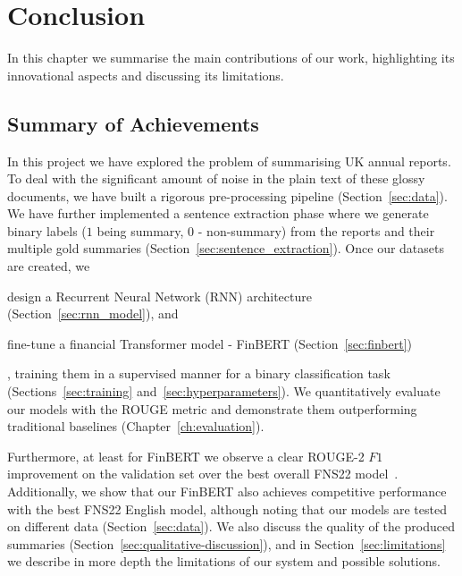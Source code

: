 \chapter{Conclusion}\label{ch:conclusion}
In this chapter we summarise the main contributions of our work, highlighting its innovational aspects and discussing its limitations.

\section{Summary of Achievements}\label{sec:summary}
In this project we have explored the problem of summarising UK annual reports.
To deal with the significant amount of noise in the plain text of these glossy documents, we have built a rigorous pre-processing pipeline (Section~\ref{sec:data}).
We have further implemented a sentence extraction phase where we generate binary labels ($1$ being summary, $0$ - non-summary) from the reports and their multiple gold summaries (Section~\ref{sec:sentence_extraction}).
Once our datasets are created, we
\begin{enumerate*}[label=(\alph*)]
    \item design a Recurrent Neural Network (RNN) architecture (Section~\ref{sec:rnn_model}), and
    \item fine-tune a financial Transformer model - FinBERT (Section~\ref{sec:finbert})
\end{enumerate*},
training them in a supervised manner for a binary classification task (Sections~\ref{sec:training} and~\ref{sec:hyperparameters}).
We quantitatively evaluate our models with the ROUGE metric and demonstrate them outperforming traditional baselines (Chapter~\ref{ch:evaluation}).


Furthermore, at least for FinBERT we observe a clear ROUGE-2 $F1$ improvement on the validation set over the best overall FNS22 model~\cite{foroutan-etal-2022-multilingual}.
Additionally, we show that our FinBERT also achieves competitive performance with the best FNS22 English model,
although noting that our models are tested on different data (Section~\ref{sec:data}).
We also discuss the quality of the produced summaries (Section~\ref{sec:qualitative-discussion}), and in
Section~\ref{sec:limitations} we describe in more depth the limitations of our system and possible solutions.


